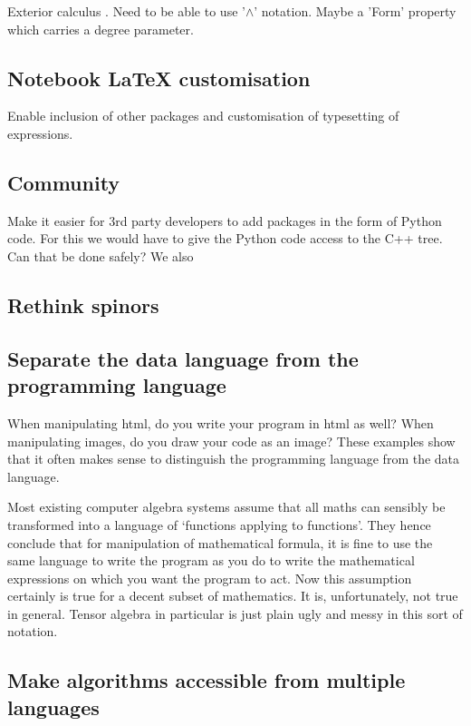 \documentclass[11pt]{article}
\begin{document}
Exterior calculus \cite{xTerior}. Need to be able to use '$\wedge$'
notation. Maybe a 'Form' property which carries a degree parameter.


\subsection{Notebook \LaTeX{} customisation}

Enable inclusion of other packages and customisation of typesetting of expressions.

\subsection{Community}

Make it easier for 3rd party developers to add packages in the form of
Python code. For this we would have to give the Python code access to
the C++ tree. Can that be done safely? We also 

\subsection{Rethink spinors}

\subsection{Separate the data language from the programming language}

When manipulating html, do you write your program in html as well?
When manipulating images, do you draw your code as an image? These
examples show that it often makes sense to distinguish the programming
language from the data language.

Most existing computer algebra systems assume that all maths can
sensibly be transformed into a language of `functions applying to
functions'. They hence conclude that for manipulation of mathematical
formula, it is fine to use the same language to write the program as
you do to write the mathematical expressions on which you want the
program to act. Now this assumption certainly is true for a decent
subset of mathematics. It is, unfortunately, not true in
general. Tensor algebra in particular is just plain ugly and messy in
this sort of notation.


\subsection{Make algorithms accessible from multiple languages}
\end{document}
